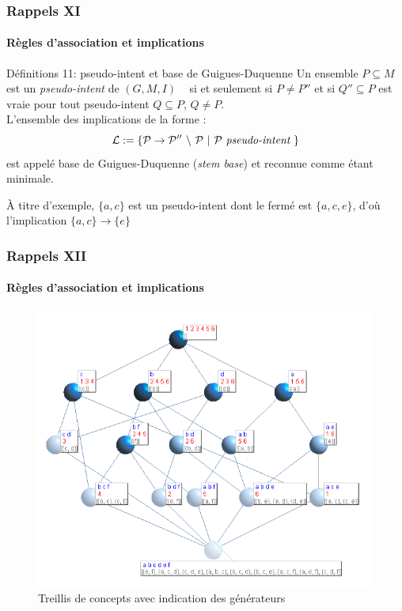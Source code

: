 \documentclass[french]{beamer}
\begin{document}
\begin{frame}
\frametitle{Rappels XI}
\framesubtitle{Règles d'association et implications}
\begin{block}{Définitions 11: pseudo-intent et base de Guigues-Duquenne}
Un ensemble $P \subseteq M$ est un \emph{pseudo-intent} de $(G, M, I)$ ~\parencite{Ganter1999,Guigues1986} si et seulement si $P \neq P''$ et si $Q'' \subseteq P$ est vraie pour tout pseudo-intent $Q \subseteq P$, $Q \ne P.$ \\
L'ensemble des implications de la forme :
$$\cal{L} := \{ P \rightarrow P''\ \backslash\ P\ |\ P\ \textit{pseudo-intent}\ \}$$
est appelé base de Guigues-Duquenne (\emph{stem base}) et reconnue comme étant minimale.
\end{block}
À titre d'exemple, $\{a, c\}$ est un pseudo-intent dont le fermé est $\{a, c, e\}$, d'où l'implication $\{a, c\} \rightarrow \{e\}$
\end{frame}

\begin{frame}
\frametitle{Rappels XII}
\framesubtitle{Règles d'association et implications}
\begin{figure}[H]
\label{cap:fig:treillis-gen}
\begin{center}\includegraphics[scale=0.36]{figures/Treillis21FullLabelGen.png}\end{center}
\caption{Treillis de concepts avec indication des générateurs}
\end{figure}
\end{frame}
\end{document}
